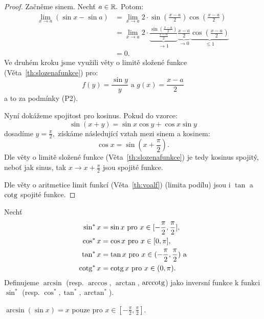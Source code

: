 \begin{proof}
    Začněme sinem. Nechť $a \in \mathbb{R}.$ Potom:
        \begin{align*}
            \lim_{x \to a} (\sin x - \sin a) 
            &= \lim_{x \to a} 2\cdot\sin\left(\frac{x - a}{2}\right)
                \cos\left(\frac{x-a}{2}\right) \tag{goniometrický vzorec} \\
            &= \lim_{x \to a} 2 \cdot 
                \underbrace{\frac{\sin\left(\frac{x - a}{2}\right)}{\frac{x - a}{2}}}_{\to 1}
                \underbrace{\frac{x - a}{2}}_{\to 0} 
                \underbrace{\cos\left(\frac{x-a}{2}\right)}_{\leq 1}
                \tag{viz níže} \\
            &= 0.
        \end{align*}
    Ve druhém kroku jsme využili věty o limitě složené funkce (Věta~\ref{th:slozenafunkce})
    pro:
    $$f(y) = \frac{\sin y}{y} \text{ a } g(x) = \frac{x-a}{2}$$
    a to za podmínky (P2).

    Nyní dokážeme spojitost pro kosinus. Pokud do vzorce:
    $$\sin(x + y) = \sin x \cos y + \cos x \sin y$$
    dosadíme $y = \frac{\pi}{2},$ získáme následující vztah mezi sinem 
    a kosinem:
    $$\cos x = \sin(x + \frac{\pi}{2}).$$ 
    Dle věty o limitě složené funkce (Věta~\ref{th:slozenafunkce})
    je tedy kosinus spojitý, neboť jak sinus, tak $x \rightarrow x + \frac{\pi}{2}$
    jsou spojité funkce.

    Dle věty o aritmetice limit funkcí (Věta~\ref{th:voalf}) (limita podílu) 
    jsou i $\tan$ a $\operatorname{cotg}$ spojité funkce.
\end{proof}

\begin{definition}
    Nechť
    \begin{align*}
        \sin^* x &= \sin x \text{ pro } x \in [-\frac{\pi}{2}, \frac{\pi}{2}], \\
        \cos^* x &= \cos x \text{ pro } x \in [0, \pi], \\
        \tan^* x &= \tan x \text{ pro } x \in (-\frac{\pi}{2}, \frac{\pi}{2}) \text{ a} \\
        \operatorname{cotg}^* x &= \operatorname{cotg} x \text{ pro } x \in (0, \pi).
    \end{align*}
    Definujeme $\arcsin$ (resp. $\arccos$, $\arctan$, $\operatorname{arccotg}$) jako inversní
    funkce k funkci $\sin^*$ (resp. $\cos^*, \tan^*, \arctan^*$).
\end{definition}

\begin{remark}
    $\arcsin(\sin x) = x$ pouze pro $x \in [-\frac{\pi}{2}, \frac{\pi}{2}].$
\end{remark}

